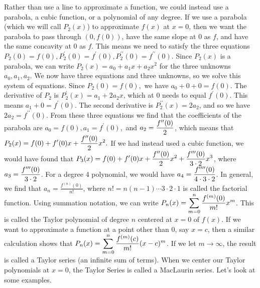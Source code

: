 Rather than use a line to approximate a function, we could instead use a parabola, a cubic function, or a polynomial of any degree. If we use a parabola (which we will call $P_2(x)$) to approximate $f(x)$ at $x=0$, then we want the parabola to pass through $(0,f(0))$, have the same slope at $0$ as $f$, and have the same concavity at $0$ as $f$.  This means we need to satisfy the three equations $P_2(0)=f(0),P_2^\prime(0)=f^\prime(0),P_2^{\prime\prime}(0)=f^{\prime\prime}(0)$. Since $P_2(x)$ is a parabola, we can write $P_2(x)=a_0 + a_1 x+a_2 x^2$ for the three unknowns $a_0,a_1,a_2$. We now have three equations and three unknowns, so we solve this system of equations. Since $P_2(0)=f(0),$ we have $a_0+0+0 = f(0)$.  The derivative of $P_2$ is $P_2^\prime(x) = a_1+2a_2x$, which at $0$ needs to equal $f^\prime(0)$. This means $a_1+0 = f^\prime(0)$.  The second derivative is $P_2^{\prime\prime}(x)=2a_2$, and so we have $2a_2=f^{\prime\prime}(0)$.  From these three equations we find that the coefficients of the parabola are $a_0=f(0), a_1=f^\prime(0),$ and $\displaystyle a_2=\frac{f^{\prime\prime}(0)}{2}$, which means that $\displaystyle P_2(x) = f(0)+f^\prime(0)x+\frac{f^{\prime\prime}(0)}{2}x^2.$ If we had instead used a cubic function, we would have found that $\displaystyle P_3(x) = f(0)+f^\prime(0)x+\frac{f^{\prime\prime}(0)}{2}x^2+\frac{f^{\prime\prime\prime}(0)}{3\cdot 2}x^3$, where $\displaystyle a_3 =  \frac{f^{\prime\prime\prime}(0)}{3\cdot 2}$.  For a degree 4 polynomial, we would have $\displaystyle a_4=\frac{f^{\prime\prime\prime\prime}(0)}{4\cdot 3\cdot 2}$. In general, we find that $a_n = \frac{f^{(n)}(0)}{n!}$, where $n!=n(n-1)\cdots 3\cdot 2\cdot 1$ is called the factorial function. Using summation notation, we can write $\displaystyle P_n(x) = \sum_{m=0}^{n}\frac{f^{(m)}(0)}{m!}x^m$.  This is called the Taylor polynomial of degree $n$ centered at $x=0$ of $f(x)$. If we want to approximate a function at a point other than 0, say $x=c$, then a similar calculation shows that $\displaystyle P_n(x) = \sum_{m=0}^{n}\frac{f^{(m)}(c)}{m!}(x-c)^m$. If we let $m\to \infty$, the result is called a Taylor series (an infinite sum of terms). When we center our Taylor polynomials at $x=0$, the Taylor Series is called a MacLaurin series. Let's look at some examples.

